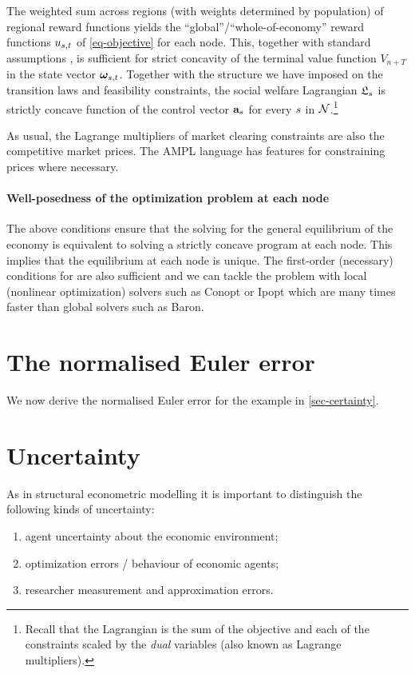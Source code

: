\documentclass[12pt,a4paper,twoside, draft]{article}
\begin{document}
The weighted sum across regions (with weights determined by population) of
regional reward functions yields the ``global''/``whole-of-economy'' reward
functions ${u}_{{s}, t}$ of \eqref{eq-objective} for each node.
This, together with standard assumptions
\citep[Theorem 12.2.12]{Stachurski-Economic_dynamics}, is sufficient for strict
concavity of the terminal value function ${V}_{n + T}$ in the state
vector $\boldsymbol{\omega}_{{s}, t}$.
Together with the structure we have imposed on the transition laws and
feasibility constraints, the social welfare Lagrangian $\mathfrak L_{{s}}$ is
strictly concave function of the control vector $\mathbf{a}_{{s}}$ for every
${s}$ in $\mathcal N$.\footnote{
Recall that the Lagrangian is the sum of the objective and each of the
constraints scaled by the \emph{dual} variables (also known as Lagrange
multipliers).
}
\begin{remark*}
As usual, the Lagrange multipliers of market clearing constraints are also the
competitive market prices.
The AMPL language has features for constraining prices where necessary.
\end{remark*}
\paragraph{Well-posedness of the optimization problem at each node}
The above conditions ensure that the solving for the general equilibrium of the
economy is equivalent to solving a strictly concave program at each node.
This implies that the equilibrium at each node is unique.
The first-order (necessary) conditions for are also sufficient and we can
tackle the problem with local (nonlinear optimization) solvers such as Conopt
or Ipopt which are many times faster than global solvers such as Baron.
\section{The normalised Euler error}
We now derive the normalised Euler error for the example in
\cref{sec-certainty}.

\section{Uncertainty}
As in structural econometric modelling
\citep{Reiss_Wolak-Structural_econometrics} it is important to distinguish the
following kinds of uncertainty:
\begin{enumerate}[I]
   \item\label{aue} agent uncertainty about the economic environment;
   \item\label{aub} optimization errors / behaviour of economic agents;
   \item\label{rum} researcher measurement and approximation errors.
\end{enumerate}
\end{document}
